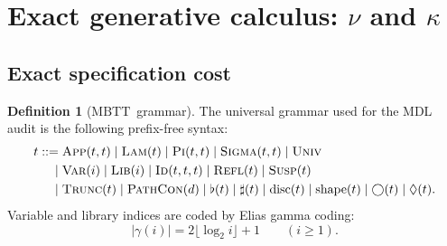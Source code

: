 \documentclass{lmcs}
\theoremstyle{plain}
\theoremstyle{definition}
\newtheorem{defi}[thm]{Definition}
\theoremstyle{remark}
\newcommand{\MBTT}{\ensuremath{\mathrm{MBTT}}}
\newcommand{\disc}{\ensuremath{\operatorname{disc}}}
\newcommand{\shape}{\ensuremath{\operatorname{shape}}}
\newcommand{\sharpm}{\ensuremath{\mathbin{\sharp}}}
\newcommand{\nextm}{\ensuremath{\bigcirc}}
\newcommand{\ev}{\ensuremath{\Diamond}}
\begin{document}
\section{Exact generative calculus: \texorpdfstring{$\nu$}{nu} and \texorpdfstring{$\kappa$}{kappa}}
\label{sec:generative}

\subsection{Exact specification cost}

\begin{defi}[\MBTT\ grammar]
\label{def:mbtt}
The universal grammar used for the MDL audit is the following prefix-free syntax:
\[
\begin{aligned}
t ::= {} & \textsc{App}(t,t)\mid \textsc{Lam}(t)\mid \textsc{Pi}(t,t)\mid \textsc{Sigma}(t,t)\mid \textsc{Univ}\\
    \mid{} & \textsc{Var}(i)\mid \textsc{Lib}(i)\mid \textsc{Id}(t,t,t)\mid \textsc{Refl}(t)\mid \textsc{Susp}(t)\\
    \mid{} & \textsc{Trunc}(t)\mid \textsc{PathCon}(d)\mid \flat(t)\mid \sharpm(t)\mid \disc(t)\mid \shape(t)\mid \nextm(t)\mid \ev(t).
\end{aligned}
\]
Variable and library indices are coded by Elias gamma coding:
\[
  |\gamma(i)| = 2\lfloor \log_2 i \rfloor + 1 \qquad (i\ge 1).
\]
\end{defi}
\end{document}
